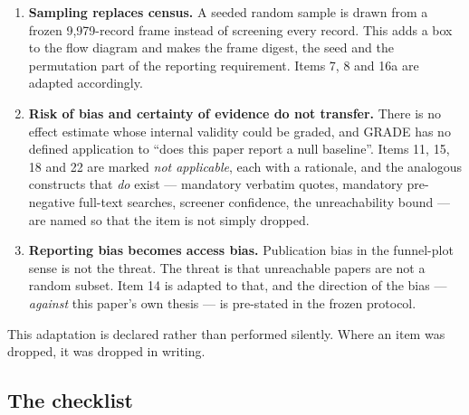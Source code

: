 \documentclass[11pt,a4paper]{article}
\begin{document}
\begin{enumerate}
\item \textbf{Sampling replaces census.} A seeded random sample is drawn from a frozen
9{,}979-record frame instead of screening every record. This adds a box to the flow
diagram and makes the frame digest, the seed and the permutation part of the reporting
requirement. Items 7, 8 and 16a are adapted accordingly.
\item \textbf{Risk of bias and certainty of evidence do not transfer.} There is no
effect estimate whose internal validity could be graded, and GRADE has no defined
application to ``does this paper report a null baseline''. Items 11, 15, 18 and 22 are
marked \emph{not applicable}, each with a rationale, and the analogous constructs that
\emph{do} exist --- mandatory verbatim quotes, mandatory pre-negative full-text
searches, screener confidence, the unreachability bound --- are named so that the item
is not simply dropped.
\item \textbf{Reporting bias becomes access bias.} Publication bias in the funnel-plot
sense is not the threat. The threat is that unreachable papers are not a random
subset. Item 14 is adapted to that, and the direction of the bias --- \emph{against}
this paper's own thesis --- is pre-stated in the frozen protocol.
\end{enumerate}

This adaptation is declared rather than performed silently. Where an item was dropped,
it was dropped in writing.

\subsection{The checklist}
\end{document}
